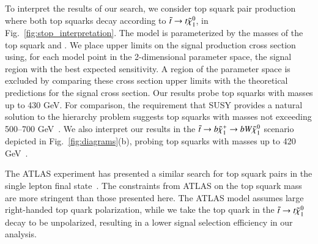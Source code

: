 

To interpret the results of our search, we consider top squark pair production where both top squarks decay according to 
$\tilde{t}\to t\tilde{\chi}_{1}^{0}$, in Fig.~\ref{fig:stop_interpretation}.
The model is parameterized by the masses of the top squark and \lsp. We place upper limits on the signal
production cross section using, for each model point in the 2-dimensional parameter space, the signal region with the best expected
sensitivity. A region of the parameter space is excluded by comparing these cross section upper limits with the theoretical predictions 
for the signal cross section.
Our results probe top squarks with masses up to 430 GeV. For comparison, the requirement that SUSY
provides a natural solution to the hierarchy problem suggests top squarks with masses not exceeding 500--700 GeV~\cite{ref:naturalsusy}.
We also interpret our results in the $\tilde{t}\to b\tilde{\chi}_{1}^{+}\to b W \tilde{\chi}_{1}^{0}$ scenario
depicted in Fig.~\ref{fig:diagrams}(b), probing top squarks with masses up to 420 GeV~\cite{ref:stop}.

The ATLAS experiment has presented a similar search for top squark pairs in the single lepton final state~\cite{ref:atlasstop}.
The constraints from ATLAS on the top squark mass are more stringent than those presented here. The ATLAS model assumes large 
right-handed top quark polarization, while we take the top quark in the $\tilde{t}\to t\tilde{\chi}_{1}^{0}$ decay to be unpolarized, 
resulting in a lower signal selection efficiency in our analysis.

